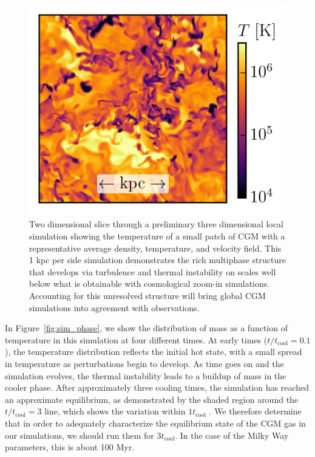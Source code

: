 \documentclass[11pt,letterpaper,english]{article}
\begin{document}
\begin{figure}[h]
    \centering
    \begin{minipage}{0.33\textwidth}
\caption{Two dimensional slice through a preliminary three dimensional local simulation showing the temperature of a small patch of CGM with a representative average density, temperature, and velocity field. This 1 kpc per side simulation demonstrates the rich multiphase structure that develops via turbulence and thermal instability on scales well below what is obtainable with cosmological zoom-in simulations. Accounting for this unresolved structure will bring global CGM simulations \cite{Fielding17} into agreement with observations. \label{fig:CGMpatch}}
    \end{minipage}\hfill
    \begin{minipage}{0.67\textwidth}
        \hspace{0.3cm} 
        \includegraphics[width=1.04\textwidth]{T_proposal.png} 
    \end{minipage}
\end{figure}

In Figure~\ref{fig:sim_phase}, we show the distribution of mass as a function of temperature in this simulation at four different times. At early times ($t / t_\mathrm{cool} = 0.1$), the temperature distribution reflects the initial hot state, with a small spread in temperature as perturbations begin to develop. As time goes on and the simulation evolves, the thermal instability leads to a buildup of mass in the cooler phase. After approximately three cooling times, the simulation has reached an approximate equilibrium, as demonstrated by the shaded region around the $t / t_\mathrm{cool} = 3$ line, which shows the variation within $1t_\mathrm{cool}$ . We therefore determine that in order to adequately characterize the equilibrium state of the CGM gas in our simulations, we should run them for $3 t_\mathrm{cool}$. In the case of the Milky Way parameters, this is about 100 Myr.
\end{document}
